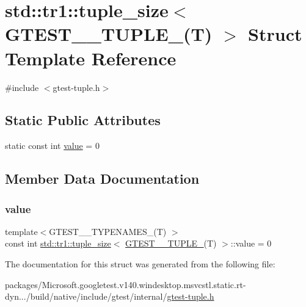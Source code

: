 \hypertarget{structstd_1_1tr1_1_1tuple__size_3_01_g_t_e_s_t__0___t_u_p_l_e___07_t_08_01_4}{}\section{std\+::tr1\+::tuple\+\_\+size$<$ G\+T\+E\+S\+T\+\_\+\_\+\+T\+U\+P\+L\+E\+\_\+(T) $>$ Struct Template Reference}
\label{structstd_1_1tr1_1_1tuple__size_3_01_g_t_e_s_t__0___t_u_p_l_e___07_t_08_01_4}


{\ttfamily \#include $<$gtest-\/tuple.\+h$>$}

\subsection*{Static Public Attributes}
\begin{DoxyCompactItemize}
\item 
static const int \mbox{\hyperlink{structstd_1_1tr1_1_1tuple__size_3_01_g_t_e_s_t__0___t_u_p_l_e___07_t_08_01_4_af34d6d0b87d7379b14817a386c1e18ee}{value}} = 0
\end{DoxyCompactItemize}


\subsection{Member Data Documentation}
\mbox{\label{structstd_1_1tr1_1_1tuple__size_3_01_g_t_e_s_t__0___t_u_p_l_e___07_t_08_01_4_af34d6d0b87d7379b14817a386c1e18ee}} 
\subsubsection{\texorpdfstring{value}{value}}
{\footnotesize\ttfamily template$<$G\+T\+E\+S\+T\+\_\+\_\+\+T\+Y\+P\+E\+N\+A\+M\+E\+S\+\_\+(\+T) $>$ \\
const int \mbox{\hyperlink{structstd_1_1tr1_1_1tuple__size}{std\+::tr1\+::tuple\+\_\+size}}$<$ \mbox{\hyperlink{gtest-tuple_8h_acecddf48fa29ec4b0199d5a467e89778}{G\+T\+E\+S\+T\+\_\+\_\+\+T\+U\+P\+L\+E\+\_\+}}(T) $>$\+::value = 0\hspace{0.3cm}{\ttfamily [static]}}



The documentation for this struct was generated from the following file\+:\begin{DoxyCompactItemize}
\item 
packages/\+Microsoft.\+googletest.\+v140.\+windesktop.\+msvcstl.\+static.\+rt-\/dyn.../build/native/include/gtest/internal/\mbox{\hyperlink{gtest-tuple_8h}{gtest-\/tuple.\+h}}\end{DoxyCompactItemize}
